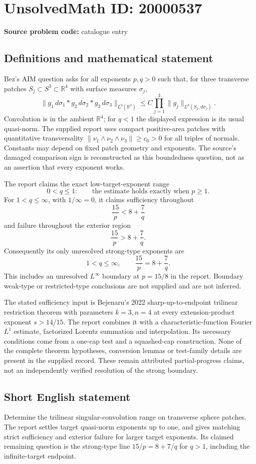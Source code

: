 \documentclass[11pt]{article}
\newcommand{\R}{\mathbb{R}}
\begin{document}
\section*{UnsolvedMath ID: 20000537}
\textbf{Source problem code:} catalogue entry
\subsection{Definitions and mathematical statement}
Bez's AIM question asks for all exponents $p,q>0$ such that, for three transverse patches $S_j\subset S^3\subset\R^4$ with surface measures $\sigma_j$,
\[
 \|g_1\,d\sigma_1*g_2\,d\sigma_2*g_3\,d\sigma_3\|_{L^q(\R^4)}
 \leq C\prod_{j=1}^3\|g_j\|_{L^p(S_j,d\sigma_j)}.
\]
Convolution is in the ambient $\R^4$; for $q<1$ the displayed expression is its usual quasi-norm. The supplied report uses compact positive-area patches with quantitative transversality $\|\nu_1\wedge\nu_2\wedge\nu_3\|\geq c_0>0$ for all triples of normals. Constants may depend on fixed patch geometry and exponents. The source's damaged comparison sign is reconstructed as this boundedness question, not as an assertion that every exponent works.

The report claims the exact low-target-exponent range
\[
 0<q\leq1:\qquad\text{the estimate holds exactly when }p\geq1.
\]
For $1<q\leq\infty$, with $1/\infty=0$, it claims sufficiency throughout
\[
 \frac{15}{p}<8+\frac7q
\]
and failure throughout the exterior region
\[
 \frac{15}{p}>8+\frac7q.
\]
Consequently its only unresolved strong-type exponents are
\[
 1<q\leq\infty,\qquad\frac{15}{p}=8+\frac7q.
\]
This includes an unresolved $L^\infty$ boundary at $p=15/8$ in the report. Boundary weak-type or restricted-type conclusions are not supplied and are not inferred.

The stated sufficiency input is Bejenaru's 2022 sharp-up-to-endpoint trilinear restriction theorem with parameters $k=3,n=4$ at every extension-product exponent $s>14/15$. The report combines it with a characteristic-function Fourier $L^1$ estimate, factorized Lorentz summation and interpolation. Its necessary conditions come from a one-cap test and a squashed-cap construction. None of the complete theorem hypotheses, conversion lemmas or test-family details are present in the supplied record. These remain attributed partial-progress claims, not an independently verified resolution of the strong boundary.
\subsection{Short English statement}
Determine the trilinear singular-convolution range on transverse sphere patches. The report settles target quasi-norm exponents up to one, and gives matching strict sufficiency and exterior failure for larger target exponents. Its claimed remaining question is the strong-type line $15/p=8+7/q$ for $q>1$, including the infinite-target endpoint.
\end{document}

